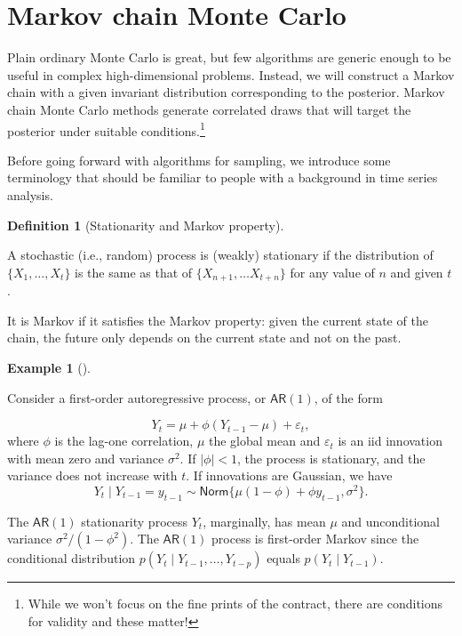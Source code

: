 \documentclass[
  11pt,
  letterpaper,
]{scrbook}
\theoremstyle{definition}
\newtheorem{example}{Example}[chapter]
\theoremstyle{definition}
\newtheorem{definition}{Definition}[chapter]
\theoremstyle{definition}
\theoremstyle{plain}
\theoremstyle{remark}
\begin{document}
\hypertarget{markov-chain-monte-carlo}{%
\section{Markov chain Monte Carlo}\label{markov-chain-monte-carlo}}

Plain ordinary Monte Carlo is great, but few algorithms are generic
enough to be useful in complex high-dimensional problems. Instead, we
will construct a Markov chain with a given invariant distribution
corresponding to the posterior. Markov chain Monte Carlo methods
generate correlated draws that will target the posterior under suitable
conditions.\footnote{While we won't focus on the fine prints of the
  contract, there are conditions for validity and these matter!}

Before going forward with algorithms for sampling, we introduce some
terminology that should be familiar to people with a background in time
series analysis.

\begin{definition}[Stationarity and Markov
property]\protect\hypertarget{def-weak-stationarity}{}\label{def-weak-stationarity}

A stochastic (i.e., random) process is (weakly) stationary if the
distribution of \(\{X_1, \ldots, X_t\}\) is the same as that of
\(\{X_{n+1}, \ldots X_{t+n}\}\) for any value of \(n\) and given \(t\).

It is Markov if it satisfies the Markov property: given the current
state of the chain, the future only depends on the current state and not
on the past.

\end{definition}

\begin{example}[]\protect\hypertarget{exm-autoregressive-one}{}\label{exm-autoregressive-one}

Consider a first-order autoregressive process, or \(\mathsf{AR}(1)\), of
the form

\[Y_t = \mu + \phi(Y_{t-1} - \mu) + \varepsilon_t,\] where \(\phi\) is
the lag-one correlation, \(\mu\) the global mean and \(\varepsilon_t\)
is an iid innovation with mean zero and variance \(\sigma^2\). If
\(|\phi| < 1\), the process is stationary, and the variance does not
increase with \(t\). If innovations are Gaussian, we have
\[Y_t \mid Y_{t-1}=y_{t-1} \sim \mathsf{Norm}\{\mu(1-\phi)+ \phi y_{t-1}, \sigma^2\}.\]

The \(\mathsf{AR}(1)\) stationarity process \(Y_t\), marginally, has
mean \(\mu\) and unconditional variance \(\sigma^2/(1-\phi^2)\). The
\(\mathsf{AR}(1)\) process is first-order Markov since the conditional
distribution \(p(Y_t \mid Y_{t-1}, \ldots, Y_{t-p})\) equals
\(p(Y_t \mid Y_{t-1})\).

\end{example}
\end{document}

